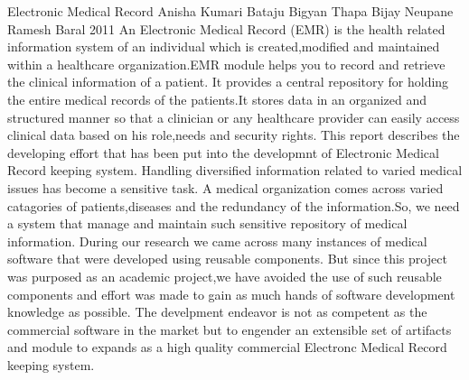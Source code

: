  \begin{conf-abstract}[]
{Electronic Medical Record}
{ Anisha Kumari Bataju
Bigyan Thapa
Bijay Neupane
Ramesh Baral
}
{2011}
An Electronic Medical Record (EMR) is the health related information system of an individual which is created,modified and maintained within a healthcare organization.EMR module helps you to record and retrieve the clinical information of a patient. It provides a central repository for holding the entire medical records of the patients.It stores data in an organized and structured manner so that a clinician or any healthcare provider can easily access clinical data based on his role,needs and security rights.
This report describes the developing effort that has been put into the developmnt of Electronic Medical Record 	keeping system. Handling diversified information related to varied medical issues has become a sensitive task.
A medical organization comes across varied catagories of patients,diseases and the redundancy of the information.So, we need a system that manage and maintain such sensitive repository of medical information.
During our research we came across many instances of medical software that were developed using reusable components. But since this project was purposed as an academic project,we have avoided the use of such reusable components and effort was made  to gain as much hands of software development knowledge as possible. The develpment endeavor is not as competent as the commercial software in the market but to engender an extensible set of artifacts and module to expands as a high quality commercial  Electronc Medical Record keeping system.
  \end{conf-abstract}